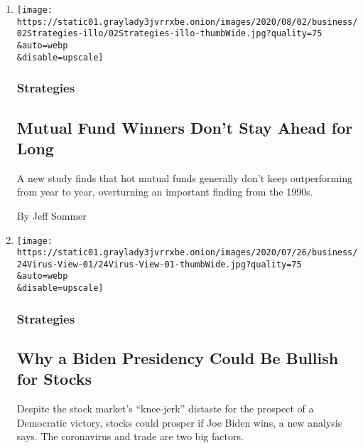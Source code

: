 \begin{enumerate}
\def\labelenumi{\arabic{enumi}.}
\item
  \href{/2020/07/31/business/mutual-fund-winners-stocks-bonds.html}{}

  \texttt{[image: https://static01.graylady3jvrrxbe.onion/images/2020/08/02/business/02Strategies-illo/02Strategies-illo-thumbWide.jpg?quality=75\\\&auto=webp\\\&disable=upscale]}

  \hypertarget{strategies}{%
  \subsubsection{Strategies}\label{strategies}}

  \hypertarget{mutual-fund-winners-dont-stay-ahead-for-long}{%
  \subsection{Mutual Fund Winners Don't Stay Ahead for
  Long}\label{mutual-fund-winners-dont-stay-ahead-for-long}}

  A new study finds that hot mutual funds generally don't keep
  outperforming from year to year, overturning an important finding from
  the 1990s.

  By Jeff Sommer
\item
  \href{/2020/07/24/business/joe-biden-stocks-taxes.html}{}

  \texttt{[image: https://static01.graylady3jvrrxbe.onion/images/2020/07/26/business/24Virus-View-01/24Virus-View-01-thumbWide.jpg?quality=75\\\&auto=webp\\\&disable=upscale]}

  \hypertarget{strategies-1}{%
  \subsubsection{Strategies}\label{strategies-1}}

  \hypertarget{why-a-biden-presidency-could-be-bullish-for-stocks}{%
  \subsection{Why a Biden Presidency Could Be Bullish for
  Stocks}\label{why-a-biden-presidency-could-be-bullish-for-stocks}}

  Despite the stock market's ``knee-jerk'' distaste for the prospect of
  a Democratic victory, stocks could prosper if Joe Biden wins, a new
  analysis says. The coronavirus and trade are two big factors.


\end{enumerate}
